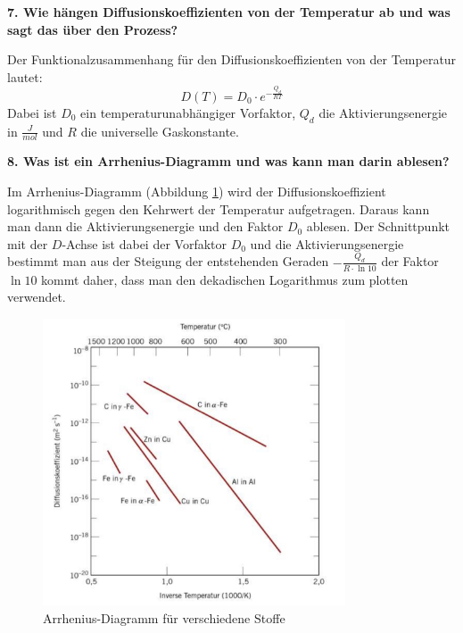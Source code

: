 \noindent\textbf{7. Wie hängen Diffusionskoeffizienten von der Temperatur ab und was sagt das über den Prozess?}\\
\begin{addmargin}[25pt]{0pt}
Der Funktionalzusammenhang für den Diffusionskoeffizienten von der Temperatur lautet:
\begin{equation}\label{eq:Diffisuion_von_Temperatur}
    D(T) = D_0\cdot e^{-\frac{Q_d}{RT}}
\end{equation}
Dabei ist $D_0$ ein temperaturunabhängiger Vorfaktor, $Q_d$ die Aktivierungsenergie in $\frac{\si{J}}{\si{mol}}$ und $R$ die universelle Gaskonstante.\\
\end{addmargin} 

\noindent\textbf{8. Was ist ein Arrhenius-Diagramm und was kann man darin ablesen? }\\
\begin{addmargin}[25pt]{0pt}
Im Arrhenius-Diagramm (Abbildung \ref{fig:arrhenius}) wird der Diffusionskoeffizient logarithmisch gegen den Kehrwert der Temperatur aufgetragen. Daraus kann man dann die Aktivierungsenergie und den Faktor $D_0$ ablesen. Der Schnittpunkt mit der $D$-Achse ist dabei der Vorfaktor $D_0$ und die Aktivierungsenergie bestimmt man aus der Steigung der entstehenden Geraden $-\frac{Q_d}{R\cdot\ln{10}}$ der Faktor $\ln{10}$ kommt daher, dass man den dekadischen Logarithmus zum plotten verwendet.\\
\begin{figure}[h]
    \centering
    \includegraphics[width = 0.8\textwidth]{images/Materialwissenschaften/Arrhenius.jpeg}
    \caption{Arrhenius-Diagramm für verschiedene Stoffe}
    \label{fig:arrhenius}
\end{figure}
\end{addmargin} 

